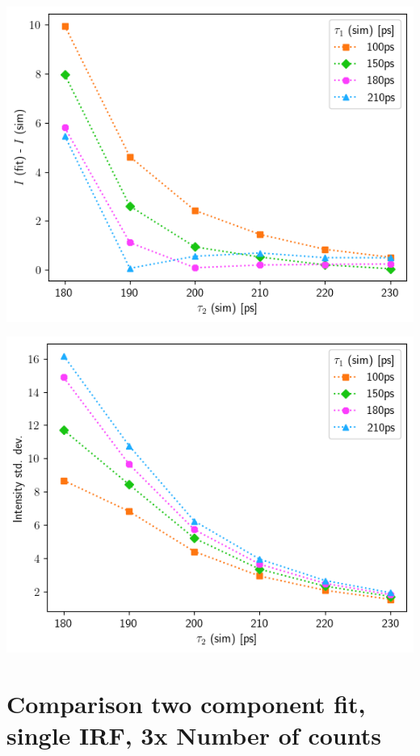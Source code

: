 {\begin{minipage}{ .47\linewidth}
    \includegraphics[width=\linewidth]{Batch 3/single Gaussian IRF/8020-diff i1.png}
    \label{fig:compirf-I-8020}
\end{minipage}
\hfill
\begin{minipage}{ .47\linewidth}
    \includegraphics[width=\linewidth]{Batch 3/single Gaussian IRF/8020-err i1.png}
    \label{fig:compirf-Ierr-8020}
\end{minipage}


\section{\boldmath Comparison two component fit, single IRF, 3x Number of counts\unboldmath\label{comp-count}}

}
